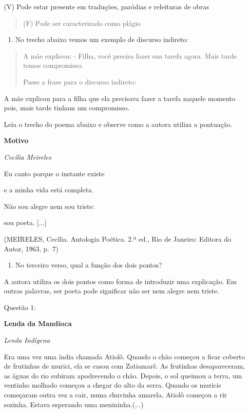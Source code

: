 (V) Pode estar presente em traduções, paródias e releituras de obras

\begin{quote}
(F) Pode ser caracterizado como plágio
\end{quote}

\begin{enumerate}
\def\labelenumi{\arabic{enumi})}
\setcounter{enumi}{8}
\tightlist
\item
  No trecho abaixo vemos um exemplo de discurso indireto:
\end{enumerate}

\begin{quote}
A mãe explicou: - Filha, você precisa fazer sua tarefa agora. Mais tarde
temos compromisso.

Passe a frase para o discurso indireto:
\end{quote}

A mãe explicou para a filha que ela precisava fazer a tarefa naquele
momento pois, mais tarde tinham um compromisso.

Leia o trecho do poema abaixo e observe como a autora utiliza a
pontuação.

\textbf{Motivo}

\emph{Cecília Meireles}

Eu canto porque o instante existe

e a minha vida está completa.

Não sou alegre nem sou triste:

sou poeta. {[}...{]}

(MEIRELES, Cecília. Antologia Poética. 2.ª ed., Rio de Janeiro: Editora
do Autor, 1963, p.~7)

\begin{enumerate}
\def\labelenumi{\arabic{enumi})}
\setcounter{enumi}{9}
\tightlist
\item
  No terceiro verso, qual a função dos dois pontos?
\end{enumerate}

A autora utiliza os dois pontos como forma de introduzir uma explicação.
Em outras palavras, ser poeta pode significar não ser nem alegre nem
triste.


Questão 1:

\textbf{Lenda da Mandioca}

\emph{Lenda Indígena}

Era uma vez uma índia chamada Atiolô. Quando o chão começou a ficar
coberto de frutinhas de murici, ela se casou com Zatiamarê. As frutinhas
desapareceram, as águas do rio subiram apodrecendo o chão. Depois, o sol
queimou a terra, um ventinho molhado começou a chegar do alto da serra.
Quando os muricis começaram outra vez a cair, numa chuvinha amarela,
Atiolô começou a rir sozinha. Estava esperando uma menininha.(...)

